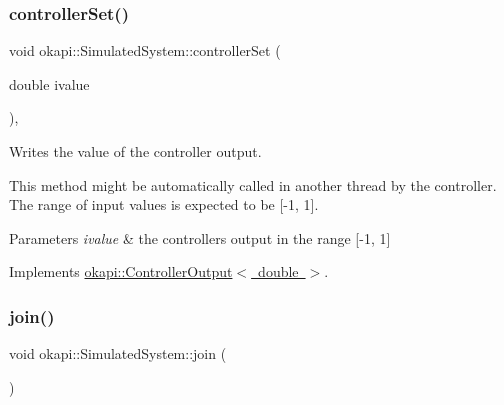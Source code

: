 \mbox{\label{classokapi_1_1SimulatedSystem_a06c467bf5d10a81ecee83f4b7203fc84}} 
\subsubsection{\texorpdfstring{controllerSet()}{controllerSet()}}
{\footnotesize\ttfamily void okapi\+::\+Simulated\+System\+::controller\+Set (\begin{DoxyParamCaption}\item[{double}]{ivalue }\end{DoxyParamCaption})\hspace{0.3cm}{\ttfamily [override]}, {\ttfamily [virtual]}}



Writes the value of the controller output. 

This method might be automatically called in another thread by the controller. The range of input values is expected to be \mbox{[}-\/1, 1\mbox{]}.


\begin{DoxyParams}{Parameters}
{\em ivalue} & the controller\textquotesingle{}s output in the range \mbox{[}-\/1, 1\mbox{]} \\
\hline
\end{DoxyParams}


Implements \mbox{\hyperlink{classokapi_1_1ControllerOutput_a360c08f0c10b36f882d6d3100c2cad49}{okapi\+::\+Controller\+Output$<$ double $>$}}.

\mbox{\label{classokapi_1_1SimulatedSystem_a1c62c7150ebd409174d5eecf2d30f7ee}} 
\subsubsection{\texorpdfstring{join()}{join()}}
{\footnotesize\ttfamily void okapi\+::\+Simulated\+System\+::join (\begin{DoxyParamCaption}{ }\end{DoxyParamCaption})}

\mbox{\label{classokapi_1_1SimulatedSystem_a32abbe4bc680eacad54a686b3be7df79}} 
